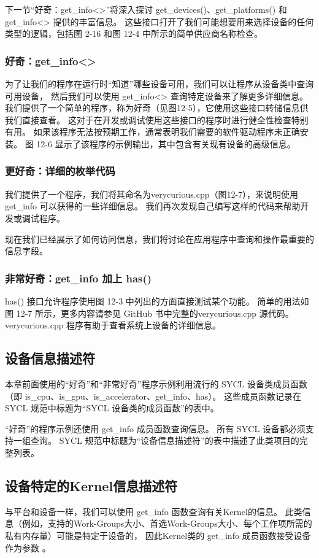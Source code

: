 下一节“好奇：get\_info<>”将深入探讨 get\_devices()、get\_platforms() 和 get\_info<> 提供的丰富信息。 
这些接口打开了我们可能想要用来选择设备的任何类型的逻辑，包括图 2-16 和图 12-4 中所示的简单供应商名称检查。

\subsubsection{好奇：get\_info<>}
为了让我们的程序在运行时“知道”哪些设备可用，我们可以让程序从设备类中查询可用设备，
然后我们可以使用 get\_info<> 查询特定设备来了解更多详细信息。 
我们提供了一个简单的程序，称为好奇（见图12-5），它使用这些接口转储信息供我们直接查看。 
这对于在开发或调试使用这些接口的程序时进行健全性检查特别有用。 
如果该程序无法按预期工作，通常表明我们需要的软件驱动程序未正确安装。 
图 12-6 显示了该程序的示例输出，其中包含有关现有设备的高级信息。

\subsubsection{更好奇：详细的枚举代码}
我们提供了一个程序，我们将其命名为verycurious.cpp（图12-7），来说明使用get\_info 可以获得的一些详细信息。 
我们再次发现自己编写这样的代码来帮助开发或调试程序。

现在我们已经展示了如何访问信息，我们将讨论在应用程序中查询和操作最重要的信息字段。

\subsubsection{非常好奇：get\_info 加上 has()}
has() 接口允许程序使用图 12-3 中列出的方面直接测试某个功能。 
简单的用法如图 12-7 所示，更多内容请参见 GitHub 书中完整的verycurious.cpp 源代码。
 verycurious.cpp 程序有助于查看系统上设备的详细信息。

\subsection{设备信息描述符}
本章前面使用的“好奇”和“非常好奇”程序示例利用流行的 SYCL 设备类成员函数
（即 is\_cpu、is\_gpu、is\_accelerator、get\_info、has）。 
这些成员函数记录在 SYCL 规范中标题为“SYCL 设备类的成员函数”的表中。

“好奇”的程序示例还使用 get\_info 成员函数查询信息。 所有 SYCL 设备都必须支持一组查询。 
SYCL 规范中标题为“设备信息描述符”的表中描述了此类项目的完整列表。

\subsection{设备特定的Kernel信息描述符}
与平台和设备一样，我们可以使用 get\_info 函数查询有关Kernel的信息。 
此类信息（例如，支持的Work-Groups大小、首选Work-Groups大小、每个工作项所需的私有内存量）可能是特定于设备的，
因此Kernel类的 get\_info 成员函数接受设备作为参数 。

